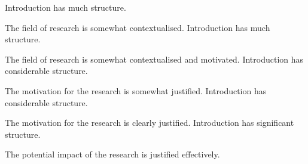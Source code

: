 \documentclass{../fal_assignment}
\begin{document}
\begin{markingrubric}
        \grade \fail 
      \grade Introduction has much structure.
        	\par The field of research is somewhat contextualised.
      \grade Introduction has much structure.
        	\par The field of research is somewhat contextualised and motivated.	      	
       \grade Introduction has considerable structure.
        	\par The motivation for the research is somewhat justified.	  
      \grade Introduction has considerable structure.
        	\par The motivation for the research is clearly justified.	 	      	
       \grade Introduction has significant structure.
        	\par The potential impact of the research is justified effectively.
        		

\end{markingrubric}
\end{document}
